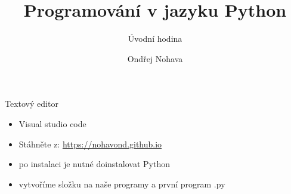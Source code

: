 \documentclass{beamer}
\title{Programování v jazyku Python}
\subtitle{Úvodní hodina}
\author{Ondřej Nohava}
\institute[DDMJH]{Dům dětí a mládeže Jindřichův Hradec}
\date{}
\begin{document}
\begin{frame}
\titlepage
\end{frame}

\begin{frame}[t]{Textový editor}

\begin{itemize}
	\item Visual studio code	
	
	\item Stáhněte z: \href{https://nohavond.github.io}{https://nohavond.github.io}
	
	\pause	
	
	\item po instalaci je nutné doinstalovat Python
	
	\pause	
	
	\item vytvoříme složku na naše programy a první program .py
\end{itemize}

\end{frame}
\end{document}
